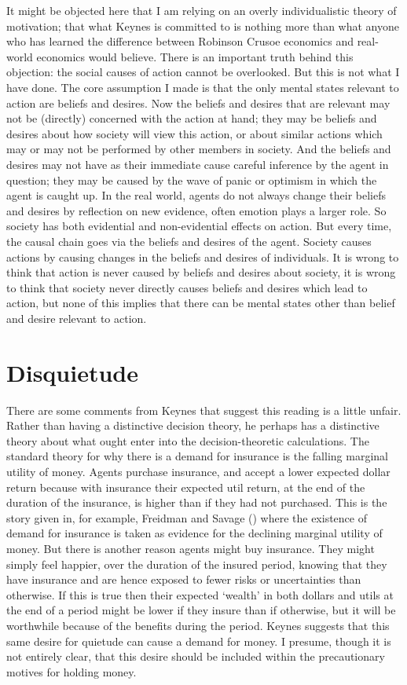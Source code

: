 \documentclass[
  11pt,
  letterpaper,
  DIV=11,
  numbers=noendperiod,
  twoside]{scrartcl}
\begin{document}
It might be objected here that I am relying on an overly individualistic
theory of motivation; that what Keynes is committed to is nothing more
than what anyone who has learned the difference between Robinson Crusoe
economics and real-world economics would believe. There is an important
truth behind this objection: the social causes of action cannot be
overlooked. But this is not what I have done. The core assumption I made
is that the only mental states relevant to action are beliefs and
desires. Now the beliefs and desires that are relevant may not be
(directly) concerned with the action at hand; they may be beliefs and
desires about how society will view this action, or about similar
actions which may or may not be performed by other members in society.
And the beliefs and desires may not have as their immediate cause
careful inference by the agent in question; they may be caused by the
wave of panic or optimism in which the agent is caught up. In the real
world, agents do not always change their beliefs and desires by
reflection on new evidence, often emotion plays a larger role. So
society has both evidential and non-evidential effects on action. But
every time, the causal chain goes via the beliefs and desires of the
agent. Society causes actions by causing changes in the beliefs and
desires of individuals. It is wrong to think that action is never caused
by beliefs and desires about society, it is wrong to think that society
never directly causes beliefs and desires which lead to action, but none
of this implies that there can be mental states other than belief and
desire relevant to action.

\section{Disquietude}\label{disquietude}

There are some comments from Keynes that suggest this reading is a
little unfair. Rather than having a distinctive decision theory, he
perhaps has a distinctive theory about what ought enter into the
decision-theoretic calculations. The standard theory for why there is a
demand for insurance is the falling marginal utility of money. Agents
purchase insurance, and accept a lower expected dollar return because
with insurance their expected util return, at the end of the duration of
the insurance, is higher than if they had not purchased. This is the
story given in, for example, Freidman and Savage
() where the existence of demand
for insurance is taken as evidence for the declining marginal utility of
money. But there is another reason agents might buy insurance. They
might simply feel happier, over the duration of the insured period,
knowing that they have insurance and are hence exposed to fewer risks or
uncertainties than otherwise. If this is true then their expected
`wealth' in both dollars and utils at the end of a period might be lower
if they insure than if otherwise, but it will be worthwhile because of
the benefits during the period. Keynes suggests that this same desire
for quietude can cause a demand for money. I presume, though it is not
entirely clear, that this desire should be included within the
precautionary motives for holding money.
\end{document}

